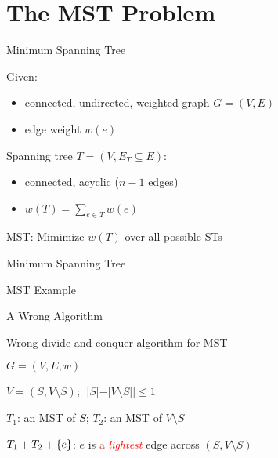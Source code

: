 \section{The MST Problem}	\label{section:mst-problem}

\begin{frame}{Minimum Spanning Tree}
  \begin{definition}[MST]
	Given:
	\begin{itemize}
	  \item connected, undirected, weighted graph $G = (V, E)$
	  \item edge weight $w(e)$
	\end{itemize}
    
	\pause
	\vspace{0.30cm}

	Spanning tree $T = (V, E_{T} \subseteq E)$:
	\begin{itemize}
	  \item connected, acyclic \pause ($n-1$ edges)
		\pause
	  \item $w(T) = \sum_{e \in T} w(e)$
	\end{itemize}

	\pause
	\vspace{0.80cm}
	\centerline{MST: Mimimize $w(T)$ over all possible STs}
  \end{definition}
\end{frame}
\begin{frame}{Minimum Spanning Tree}
  \begin{exampleblock}{MST Example}
  \end{exampleblock}
\end{frame}
\begin{frame}{A Wrong Algorithm}
  \begin{exampleblock}{Wrong divide-and-conquer algorithm for MST}
    \begin{description}
	  \item[Input:] $G = (V, E, w)$
	  \item[Divide:] $V = (S, V \setminus S)$; $||S| - |V \setminus S|| \le 1$ \uncover<2->{\textcolor{red}{(Cut)}}
	  \item<3->[Conquer:] $T_1$: an MST of $S$; $T_2$: an MST of $V \setminus S$
	  \item<4->[Combine:] $T_{1} + T_{2} + \{e\}$: $e$ is \textcolor{brown}{a} \textcolor{red}{\it lightest} edge across $(S, V \setminus S)$
    \end{description}
  \end{exampleblock}

  \pause
  \vspace{0.50cm}

\end{frame}
